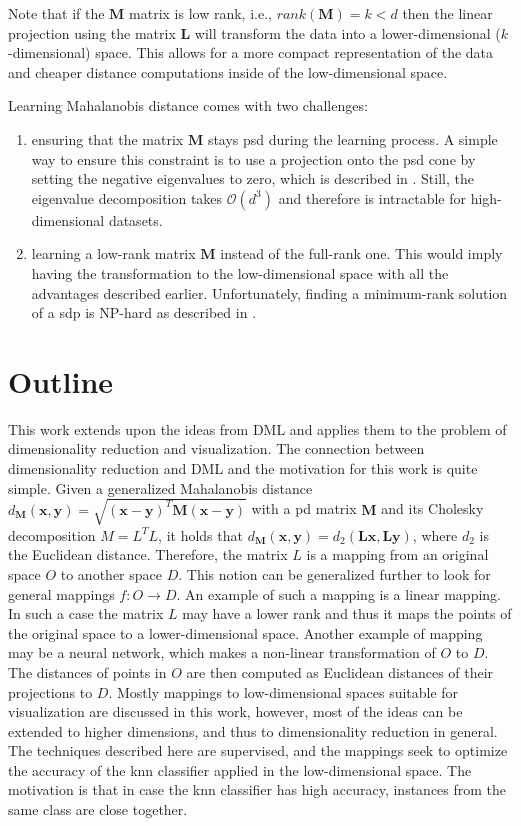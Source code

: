 \documentclass[12pt,a4paper]{report}
\begin{document}
Note that if the $\bm{M}$ matrix is low rank, i.e., $rank(\bm{M})=k<d$ then the linear projection using the matrix $\bm{L}$ will transform the data into a lower-dimensional ($k$-dimensional) space. This allows for a more compact representation of the data and cheaper distance computations inside of the low-dimensional space.

Learning Mahalanobis distance comes with two challenges:
\begin{enumerate}
\item ensuring that the matrix $\bm{M}$ stays \ac{psd} during the learning process. A simple way to ensure this constraint is to use a projection onto the \ac{psd} cone by setting the negative eigenvalues to zero, which is described in \citep{qian2015efficient}. Still, the eigenvalue decomposition takes $\mathcal{O}(d^3)$ and therefore is intractable for high-dimensional datasets.
\item learning a low-rank matrix $\bm{M}$ instead of the full-rank one. This would imply having the transformation to the low-dimensional space with all the advantages described earlier. Unfortunately, finding a minimum-rank solution of a \ac{sdp} is NP-hard as described in \citep{lemon2016low}.
\end{enumerate}

\section{Outline}
This work extends upon the ideas from DML and applies them to the problem of dimensionality reduction and visualization. The connection between dimensionality reduction and DML and the motivation for this work is quite simple. Given a generalized Mahalanobis distance $d_{\bm{M}}(\textbf{x},\textbf{y}) = \sqrt{(\textbf{x}-\textbf{y})^{T}\bm{M}(\textbf{x}-\textbf{y})}$ with a \acl{pd} matrix $\bm{M}$ and its Cholesky decomposition $M=L^TL$, it holds that $d_{\bm{M}}(\textbf{x},\textbf{y}) = d_{2}(\bm{L}\textbf{x},\bm{L}\textbf{y})$, where $d_2$ is the Euclidean distance. Therefore, the matrix $L$ is a mapping from an original space $O$ to another space $D$. This notion can be generalized further to look for general mappings $f: O \to D$. An example of such a mapping is a linear mapping. In such a case the matrix $L$ may have a lower rank and thus it maps the points of the original space to a lower-dimensional space. Another example of mapping may be a neural network, which makes a non-linear transformation of $O$ to $D$. The distances of points in $O$ are then computed as Euclidean distances of their projections to $D$. Mostly mappings to low-dimensional spaces suitable for visualization are discussed in this work, however, most of the ideas can be extended to higher dimensions, and thus to dimensionality reduction in general. The techniques described here are supervised, and the mappings seek to optimize the accuracy of the \ac{knn} classifier applied in the low-dimensional space. The motivation is that in case the \ac{knn} classifier has high accuracy, instances from the same class are close together.
\end{document}
